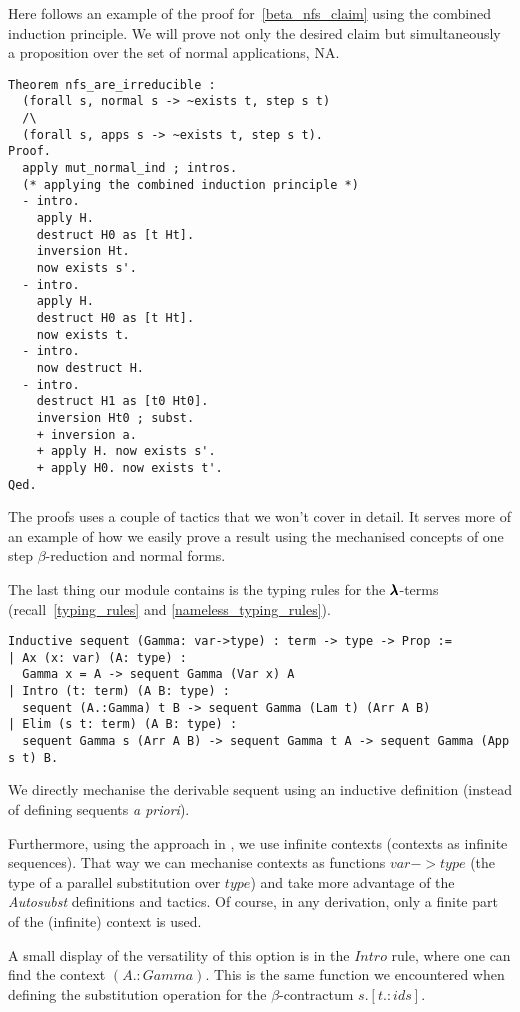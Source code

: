 Here follows an example of the proof for~\cref{beta_nfs_claim} using the combined induction principle.
We will prove not only the desired claim but simultaneously a proposition over the set of normal applications, NA.

\begin{lstlisting}[language=Coq]
Theorem nfs_are_irreducible :
  (forall s, normal s -> ~exists t, step s t)
  /\
  (forall s, apps s -> ~exists t, step s t).
Proof.
  apply mut_normal_ind ; intros.
  (* applying the combined induction principle *)
  - intro.
    apply H.
    destruct H0 as [t Ht].
    inversion Ht.
    now exists s'.
  - intro.
    apply H.
    destruct H0 as [t Ht].
    now exists t.
  - intro.
    now destruct H.
  - intro.
    destruct H1 as [t0 Ht0].
    inversion Ht0 ; subst.
    + inversion a.
    + apply H. now exists s'.
    + apply H0. now exists t'.
Qed.
\end{lstlisting}

The proofs uses a couple of tactics that we won't cover in detail.
It serves more of an example of how we easily prove a result using the mechanised concepts of one step $\beta$-reduction and normal forms.

The last thing our module contains is the typing rules for the $\pmb{\lambda}$-terms (recall~\cref{typing_rules} and \cref{nameless_typing_rules}).

\begin{lstlisting}[language=Coq]
Inductive sequent (Gamma: var->type) : term -> type -> Prop := 
| Ax (x: var) (A: type) :
  Gamma x = A -> sequent Gamma (Var x) A
| Intro (t: term) (A B: type) :
  sequent (A.:Gamma) t B -> sequent Gamma (Lam t) (Arr A B)
| Elim (s t: term) (A B: type) :
  sequent Gamma s (Arr A B) -> sequent Gamma t A -> sequent Gamma (App s t) B.
\end{lstlisting}

We directly mechanise the derivable sequent using an inductive definition (instead of defining sequents \textit{a priori}).

Furthermore, using the approach in \cite{AutosubstManual}, we use infinite contexts (contexts as infinite sequences).
That way we can mechanise contexts as functions \lst$var->type$ (the type of a parallel substitution over \lst$type$) and take more advantage of the \textit{Autosubst} definitions and tactics.
Of course, in any derivation, only a finite part of the (infinite) context is used.

A small display of the versatility of this option is in the \lst$Intro$ rule, where one can find the context \lst$(A.:Gamma)$.
This is the same function we encountered when defining the substitution operation for the $\beta$-contractum \lst$s.[t .: ids]$.

